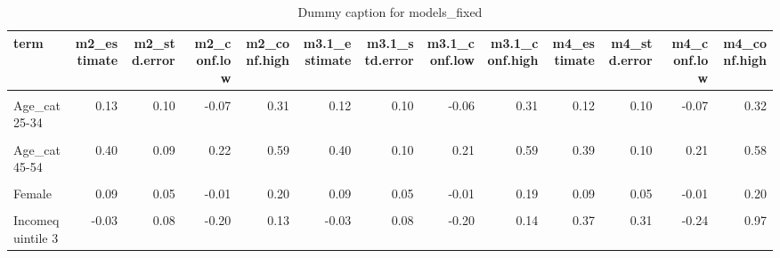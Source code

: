 \begin{table}
\centering
\caption{Dummy caption for models_fixed}
\centering
\fontsize{10}{12}\selectfont
\begin{tabular}[t]{lrrrrrrrrrrrr}
\toprule
term & m2\_estimate & m2\_std.error & m2\_conf.low & m2\_conf.high & m3.1\_estimate & m3.1\_std.error & m3.1\_conf.low & m3.1\_conf.high & m4\_estimate & m4\_std.error & m4\_conf.low & m4\_conf.high\\
\midrule
\cellcolor{gray!10}{(Intercept)} & \cellcolor{gray!10}{0.06} & \cellcolor{gray!10}{0.34} & \cellcolor{gray!10}{-0.68} & \cellcolor{gray!10}{0.86} & \cellcolor{gray!10}{0.03} & \cellcolor{gray!10}{0.24} & \cellcolor{gray!10}{-0.47} & \cellcolor{gray!10}{0.55} & \cellcolor{gray!10}{-0.05} & \cellcolor{gray!10}{0.30} & \cellcolor{gray!10}{-0.65} & \cellcolor{gray!10}{0.55}\\
Age\_cat25-34 & 0.13 & 0.10 & -0.07 & 0.31 & 0.12 & 0.10 & -0.06 & 0.31 & 0.12 & 0.10 & -0.07 & 0.32\\
\cellcolor{gray!10}{Age\_cat35-44} & \cellcolor{gray!10}{0.21} & \cellcolor{gray!10}{0.10} & \cellcolor{gray!10}{0.03} & \cellcolor{gray!10}{0.40} & \cellcolor{gray!10}{0.21} & \cellcolor{gray!10}{0.10} & \cellcolor{gray!10}{0.02} & \cellcolor{gray!10}{0.41} & \cellcolor{gray!10}{0.21} & \cellcolor{gray!10}{0.10} & \cellcolor{gray!10}{0.03} & \cellcolor{gray!10}{0.41}\\
Age\_cat45-54 & 0.40 & 0.09 & 0.22 & 0.59 & 0.40 & 0.10 & 0.21 & 0.59 & 0.39 & 0.10 & 0.21 & 0.58\\
\cellcolor{gray!10}{Age\_cat55+} & \cellcolor{gray!10}{0.56} & \cellcolor{gray!10}{0.08} & \cellcolor{gray!10}{0.40} & \cellcolor{gray!10}{0.72} & \cellcolor{gray!10}{0.56} & \cellcolor{gray!10}{0.08} & \cellcolor{gray!10}{0.39} & \cellcolor{gray!10}{0.73} & \cellcolor{gray!10}{0.55} & \cellcolor{gray!10}{0.08} & \cellcolor{gray!10}{0.38} & \cellcolor{gray!10}{0.71}\\
Female & 0.09 & 0.05 & -0.01 & 0.20 & 0.09 & 0.05 & -0.01 & 0.19 & 0.09 & 0.05 & -0.01 & 0.20\\
\cellcolor{gray!10}{Incomequintile 2} & \cellcolor{gray!10}{0.01} & \cellcolor{gray!10}{0.08} & \cellcolor{gray!10}{-0.15} & \cellcolor{gray!10}{0.17} & \cellcolor{gray!10}{0.01} & \cellcolor{gray!10}{0.08} & \cellcolor{gray!10}{-0.15} & \cellcolor{gray!10}{0.18} & \cellcolor{gray!10}{-0.08} & \cellcolor{gray!10}{0.30} & \cellcolor{gray!10}{-0.68} & \cellcolor{gray!10}{0.50}\\
Incomequintile 3 & -0.03 & 0.08 & -0.20 & 0.13 & -0.03 & 0.08 & -0.20 & 0.14 & 0.37 & 0.31 & -0.24 & 0.97\\

\end{tabular}
\end{table}
